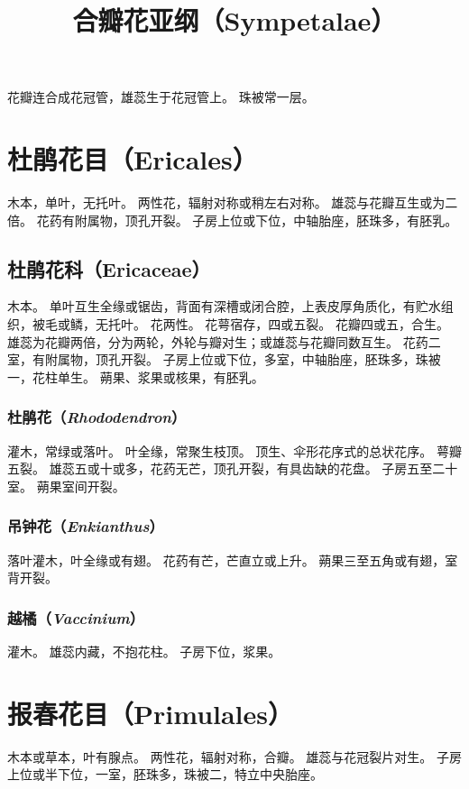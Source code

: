 \documentclass[11pt]{article}
\title{合瓣花亚纲（Sympetalae）}
\author{}
\date{}
\begin{document}
\begin{sloppypar}
  \maketitle

  \linenumbers
花瓣连合成花冠管，雄蕊生于花冠管上。
珠被常一层。

\section{杜鹃花目（Ericales）}
木本，单叶，无托叶。
两性花，辐射对称或稍左右对称。
雄蕊与花瓣互生或为二倍。
花药有附属物，顶孔开裂。
子房上位或下位，中轴胎座，胚珠多，有胚乳。

\subsection{杜鹃花科（Ericaceae）}
木本。
单叶互生全缘或锯齿，背面有深槽或闭合腔，上表皮厚角质化，有贮水组织，被毛或鳞，无托叶。
花两性。
花萼宿存，四或五裂。
花瓣四或五，合生。
雄蕊为花瓣两倍，分为两轮，外轮与瓣对生；或雄蕊与花瓣同数互生。
花药二室，有附属物，顶孔开裂。
子房上位或下位，多室，中轴胎座，胚珠多，珠被一，花柱单生。
蒴果、浆果或核果，有胚乳。
  
\subsubsection{杜鹃花（\textit{Rhododendron}）}
灌木，常绿或落叶。
叶全缘，常聚生枝顶。
顶生、伞形花序式的总状花序。
萼瓣五裂。
雄蕊五或十或多，花药无芒，顶孔开裂，有具齿缺的花盘。
子房五至二十室。
蒴果室间开裂。

\subsubsection{吊钟花（\textit{Enkianthus}）}
落叶灌木，叶全缘或有翅。
花药有芒，芒直立或上升。
蒴果三至五角或有翅，室背开裂。

\subsubsection{越橘（\textit{Vaccinium}）}
灌木。
雄蕊内藏，不抱花柱。
子房下位，浆果。

\section{报春花目（Primulales）}
木本或草本，叶有腺点。
两性花，辐射对称，合瓣。
雄蕊与花冠裂片对生。
子房上位或半下位，一室，胚珠多，珠被二，特立中央胎座。


\end{sloppypar}
\end{document}
